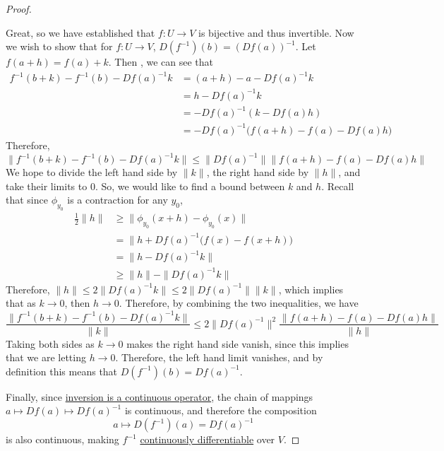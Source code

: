 \begin{proof}
\begin{enumerate}
		\end{enumerate}

		Great, so we have established that $f: U \to V$ is bijective and thus invertible. Now we wish to show that for $f: U \to V$, $D(f^{-1})(b) = (Df(a))^{-1}$. Let $f(a + h) = f(a) + k$. Then , we can see that 
		\begin{align}
			f^{-1} (b + k) - f^{-1} (b) - Df(a)^{-1} k 
				& = (a + h) - a - Df(a)^{-1} k \\ 
				& = h - Df(a)^{-1} k \\ 
				& = - Df(a)^{-1} (k - Df(a) h) \\ 
				& = -Df(a)^{-1} \big( f(a + h) - f(a) - Df(a) h \big)
		\end{align} 
		Therefore, 
		\begin{equation}
			\|f^{-1} (b + k) - f^{-1} (b) - Df(a)^{-1} k\| \leq \|Df(a)^{-1}\| \|f(a + h) - f(a) - Df(a) h\|
		\end{equation}
		We hope to divide the left hand side by $\|k\|$, the right hand side by $\|h\|$, and take their limits to $0$. So, we would like to find a bound between $k$ and $h$. Recall that since $\phi_{y_0}$ is a contraction for any $y_0$, 
		\begin{align}
			\frac{1}{2} \|h\| & \geq \|\phi_{y_0} (x + h) - \phi_{y_0} (x)\| \\
												& = \|h + Df(a)^{-1} \big( f(x) - f(x + h) \big) \\ 
												& = \| h - Df(a)^{-1} k\| \\ 
												& \geq \|h\| - \|Df(a)^{-1} k\|
		\end{align}
		Therefore, $\|h\| \leq 2 \|Df(a)^{-1} k\| \leq 2 \|Df(a)^{-1}\| \|k\|$, which implies that as $k \to 0$, then $h \to 0$. Therefore, by combining the two inequalities, we have 
		\begin{equation} 
			\frac{\|f^{-1} (b + k) - f^{-1} (b) - Df(a)^{-1} k\|}{\|k\|} \leq 2 \|Df(a)^{-1}\|^2 \frac{\|f(a + h) - f(a) - Df(a) h\|}{\|h\|}
		\end{equation}
		Taking both sides as $k \to 0$ makes the right hand side vanish, since this implies that we are letting $h \to 0$. Therefore, the left hand limit vanishes, and by definition this means that $D(f^{-1})(b) = Df(a)^{-1}$. 

		Finally, since \hyperref[lin-thm:inversion_continuous]{inversion is a continuous operator}, the chain of mappings $a \mapsto Df(a) \mapsto Df(a)^{-1}$ is continuous, and therefore the composition 
		\begin{equation}
			a \mapsto D(f^{-1})(a) = Df(a)^{-1}
		\end{equation}
		is also continuous, making $f^{-1}$ \hyperref[def:continuously-differentiable]{continuously differentiable} over $V$. 
	\end{proof}

